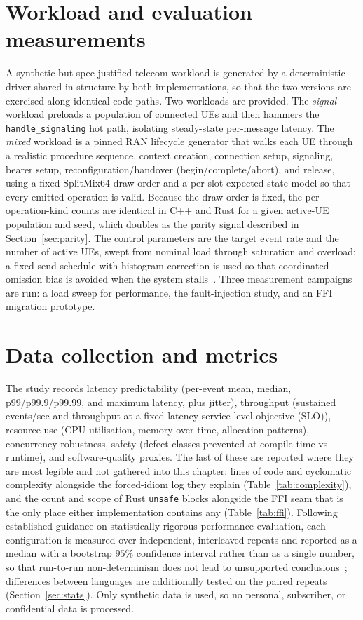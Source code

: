 \documentclass[english,twoside,openright,a4paper,censored,csm,software-track-2020]{HYthesisML}
\begin{document}
\section{Workload and evaluation measurements\label{sec:workload}}
A synthetic but spec-justified telecom workload is generated by a deterministic driver shared
in structure by both implementations, so that the two versions are exercised along identical
code paths. Two workloads are provided. The \emph{signal} workload preloads a population of
connected UEs and then hammers the \texttt{handle\_signaling} hot path, isolating steady-state
per-message latency. The \emph{mixed} workload is a pinned RAN lifecycle generator that walks
each UE through a realistic procedure sequence, context creation, connection setup, signaling,
bearer setup, reconfiguration/handover (begin/complete/abort), and release, using a fixed
SplitMix64 draw order and a per-slot expected-state model so that every emitted operation is
valid. Because the draw order is fixed, the per-operation-kind counts are identical in C++ and
Rust for a given active-UE population and seed, which doubles as the parity signal described in
Section~\ref{sec:parity}. The control parameters are the target event rate and the number of
active UEs, swept from nominal load through saturation and overload; a fixed send schedule with
histogram correction is used so that coordinated-omission bias is avoided when the system
stalls~\cite{tene_hdrhistogram}. Three measurement campaigns are run: a load sweep for
performance, the fault-injection study, and an FFI migration prototype.

\section{Data collection and metrics}
The study records latency predictability (per-event mean, median, p99/p99.9/p99.99, and
maximum latency, plus jitter), throughput (sustained events/sec and throughput at a fixed
latency service-level objective (SLO)), resource use (CPU utilisation, memory over time,
allocation patterns),
concurrency robustness, safety (defect classes prevented at compile time vs runtime), and
software-quality proxies. The last of these are reported where they are most legible and not
gathered into this chapter: lines of code and cyclomatic complexity alongside the
forced-idiom log they explain (Table~\ref{tab:complexity}), and the count and scope of Rust
\texttt{unsafe} blocks alongside the FFI seam that is the only place either implementation
contains any (Table~\ref{tab:ffi}). Following established guidance on statistically rigorous
performance evaluation, each configuration is measured over \NRepeats{} independent,
interleaved repeats and reported as a median with a bootstrap $95\%$ confidence interval rather
than as a single number, so that run-to-run non-determinism does not lead to unsupported
conclusions~\cite{georges2007rigorous}; differences between languages are additionally tested
on the paired repeats (Section~\ref{sec:stats}). Only synthetic data is used, so no personal,
subscriber, or confidential data is processed.
\end{document}
